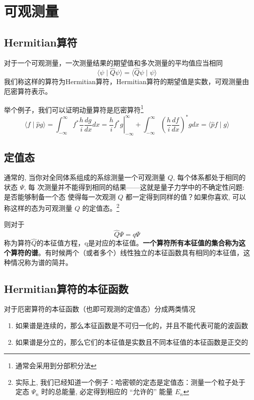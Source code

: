 \section{可观测量}
	\subsection{Hermitian算符}
		对于一个可观测量，一次测量结果的期望值和多次测量的平均值应当相同
		\begin{equation}
			\langle\psi \mid \hat{Q} \psi\rangle=\langle\hat{Q} \psi \mid \psi\rangle
		\end{equation}
		我们称这样的算符为Hermitian算符，Hermitian算符的期望值是实数，可观测量由厄密算符表示。

		举个例子，我们可以证明动量算符是厄密算符\footnote{通常会采用到分部积分法}
		\begin{equation}
			\langle f \mid \hat{p} g\rangle=\int_{-\infty}^{\infty} f^{*} \frac{h}{i} \frac{d g}{d x} d x=\left.\frac{h}{i} f^{*} g\right|_{-\infty} ^{\infty}+\int_{-\infty}^{\infty}\left(\frac{h}{i} \frac{d f}{d x}\right)^{*} g d x=\langle\hat{p} f \mid g\rangle
		\end{equation}
	\subsection{定值态}
		通常的, 当你对全同体系组成的系综测量一个可观测量 $Q$, 每个体系都处于相同的状态 $\Psi$, 每 次测量并不能得到相同的结果——这就是量子力学中的不确定性问题: 是否能够制备一个态 使得每一次观测 $Q$ 都一定得到同样的值？如果你喜欢, 可以称这样的态为可观测量 $Q$ 的定值态。\footnote{实际上, 我们已经知道一个例子：哈密顿的定态是定值态：测量一个粒子处于定态 $\Psi_{n}$ 时的总能量, 必定得到相应的 “允许的” 能量 $E_{n}$}

		则对于
		\begin{equation}
			\hat{Q} \Psi=q \Psi
		\end{equation}
		称为算符$\hat{Q}$的本征值方程，q是对应的本征值。\textbf{一个算符所有本征值的集合称为这个算符的谱}。有时候两个（或者多个）线性独立的本征函数具有相同的本征值，这种情况称为谱的简并。

	\subsection{Hermitian算符的本征函数}
		对于厄密算符的本征函数（也即可观测的定值态）分成两类情况
			\begin{enumerate}
			\item 如果谱是连续的，那么本征函数是不可归一化的，并且不能代表可能的波函数 
			\item 如果谱是分立的，那么它们的本征值是实数且不同本征值的本征函数是正交的
			\end{enumerate}

